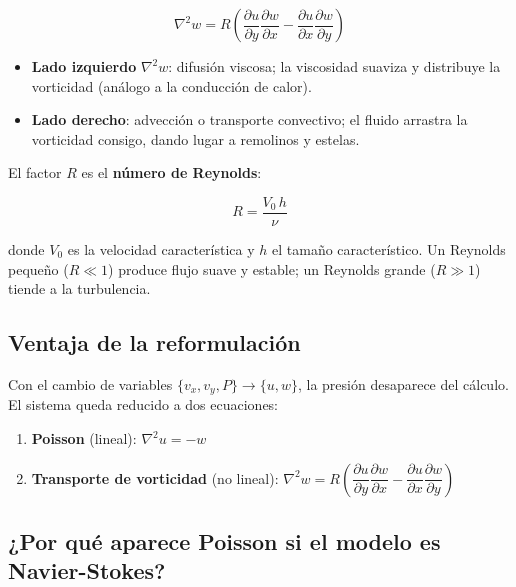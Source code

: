 \documentclass[12pt, a4paper]{article}
\begin{document}
\begin{ecbox}
  \begin{equation}
    \nabla^{2} w = R\!\left(
      \frac{\partial u}{\partial y}\frac{\partial w}{\partial x}
      - \frac{\partial u}{\partial x}\frac{\partial w}{\partial y}
    \right)
    \label{eq:transporte}
  \end{equation}
\end{ecbox}

\begin{itemize}
  \item \textbf{Lado izquierdo} $\nabla^{2}w$: difusión viscosa; la viscosidad
        suaviza y distribuye la vorticidad (análogo a la conducción de calor).
  \item \textbf{Lado derecho}: advección o transporte convectivo; el fluido
        arrastra la vorticidad consigo, dando lugar a remolinos y estelas.
\end{itemize}

El factor $R$ es el \textbf{número de Reynolds}:

\begin{equation}
  R = \frac{V_{0}\,h}{\nu}
\end{equation}

donde $V_{0}$ es la velocidad característica y $h$ el tamaño característico.
Un Reynolds pequeño ($R \ll 1$) produce flujo suave y estable; un Reynolds
grande ($R \gg 1$) tiende a la turbulencia.

\subsection{Ventaja de la reformulación}

\begin{notabox}
  Con el cambio de variables $\{v_x, v_y, P\} \to \{u, w\}$, la presión
  desaparece del cálculo. El sistema queda reducido a dos ecuaciones:
  \begin{enumerate}
    \item \textbf{Poisson} (lineal): $\nabla^{2}u = -w$
    \item \textbf{Transporte de vorticidad} (no lineal):
          $\nabla^{2}w = R\!\left(\dfrac{\partial u}{\partial y}
          \dfrac{\partial w}{\partial x}
          - \dfrac{\partial u}{\partial x}\dfrac{\partial w}{\partial y}\right)$
  \end{enumerate}
\end{notabox}

\subsection{¿Por qué aparece Poisson si el modelo es Navier-Stokes?}
\end{document}
